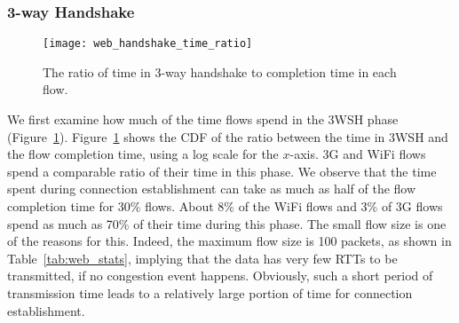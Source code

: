 
\subsubsection{3-way Handshake}

\begin{figure}[th]
\centering
\texttt{[image: web\_handshake\_time\_ratio]}
\caption{The ratio of time in 3-way handshake to completion time in each flow.}
\label{fig:web_handshake_ratio}
\end{figure}

We first examine how much of the time flows spend in the 3WSH phase (Figure~\ref{fig:web_handshake_ratio}). Figure~\ref{fig:web_handshake_ratio} shows the CDF of the ratio between the time in 3WSH and the flow completion time, using a log scale for the $x$-axis. 3G and WiFi flows spend a comparable ratio of their time in this phase. We observe that the time spent during connection establishment can take as much as half of the flow completion time for 30\% flows. About 8\% of the WiFi flows and 3\% of 3G flows spend as much as 70\% of their time during this phase. The small flow size is one of the reasons for this. Indeed, the maximum flow size is 100 packets, as shown in Table~\ref{tab:web_stats}, implying that the data has very few RTTs to be transmitted, if no congestion event happens. Obviously, such a short period of transmission time leads to a relatively large portion of time for connection establishment.



